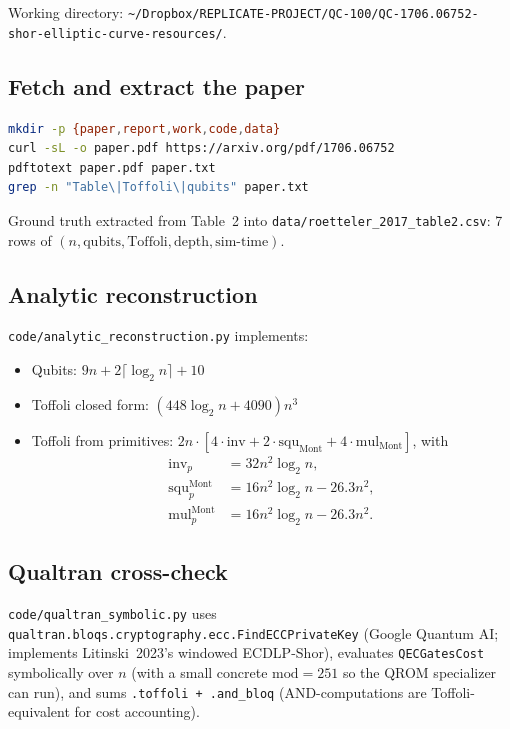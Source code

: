 \documentclass[11pt]{article}
\begin{document}
Working directory:
\texttt{\textasciitilde/Dropbox/REPLICATE-PROJECT/QC-100/QC-1706.06752-shor-elliptic-curve-resources/}.

\subsection{Fetch and extract the paper}

\begin{lstlisting}[language=bash]
mkdir -p {paper,report,work,code,data}
curl -sL -o paper.pdf https://arxiv.org/pdf/1706.06752
pdftotext paper.pdf paper.txt
grep -n "Table\|Toffoli\|qubits" paper.txt
\end{lstlisting}

Ground truth extracted from Table~2 into
\texttt{data/roetteler\_2017\_table2.csv}: 7 rows of $(n,\text{qubits},\text{Toffoli},
\text{depth},\text{sim-time})$.

\subsection{Analytic reconstruction}

\texttt{code/analytic\_reconstruction.py} implements:
\begin{itemize}
  \item Qubits: $9n + 2\lceil \log_2 n\rceil + 10$
  \item Toffoli closed form: $(448 \log_2 n + 4090) n^3$
  \item Toffoli from primitives: $2n \cdot [4\cdot\mathrm{inv} + 2\cdot\mathrm{squ}_{\mathrm{Mont}} + 4\cdot\mathrm{mul}_{\mathrm{Mont}}]$, with
    \begin{align*}
      \mathrm{inv}_{\!p} &= 32 n^2 \log_2 n, \\
      \mathrm{squ}_{\!p}^{\mathrm{Mont}} &= 16 n^2 \log_2 n - 26.3 n^2, \\
      \mathrm{mul}_{\!p}^{\mathrm{Mont}} &= 16 n^2 \log_2 n - 26.3 n^2.
    \end{align*}
\end{itemize}

\subsection{Qualtran cross-check}

\texttt{code/qualtran\_symbolic.py} uses
\texttt{qualtran.bloqs.cryptography.ecc.FindECCPrivateKey} (Google Quantum AI;
implements Litinski~2023's windowed ECDLP-Shor), evaluates \texttt{QECGatesCost}
symbolically over $n$ (with a small concrete $\text{mod}=251$ so the QROM
specializer can run), and sums \texttt{.toffoli + .and\_bloq}
(AND-computations are Toffoli-equivalent for cost accounting).
\end{document}
